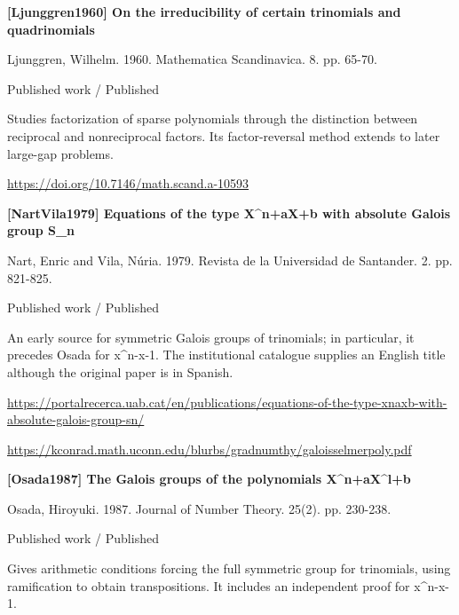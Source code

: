 \documentclass[11pt,a4paper,oneside,openany]{book}
\begin{document}
\hypertarget{ref:Ljunggren1960}{}
{\sffamily\bfseries\color{atlasgreen}[Ljunggren1960] On the irreducibility of certain trinomials and quadrinomials}\par
\color{black} Ljunggren, Wilhelm. 1960. Mathematica Scandinavica. 8. pp. 65-70.\par
{\small\sffamily\color{atlasgold}Published work / Published}\par
\color{black} Studies factorization of sparse polynomials through the distinction between reciprocal and nonreciprocal factors. Its factor-reversal method extends to later large-gap problems.\par
{\footnotesize\url{https://doi.org/10.7146/math.scand.a-10593}}\par
\vspace{9pt}
\hypertarget{ref:NartVila1979}{}
{\sffamily\bfseries\color{atlasgreen}[NartVila1979] Equations of the type X\textasciicircum{}n+aX+b with absolute Galois group S\_\allowbreak{}n}\par
\color{black} Nart, Enric and Vila, Núria. 1979. Revista de la Universidad de Santander. 2. pp. 821-825.\par
{\small\sffamily\color{atlasgold}Published work / Published}\par
\color{black} An early source for symmetric Galois groups of trinomials; in particular, it precedes Osada for x\textasciicircum{}n-x-1. The institutional catalogue supplies an English title although the original paper is in Spanish.\par
{\footnotesize\url{https://portalrecerca.uab.cat/en/publications/equations-of-the-type-xnaxb-with-absolute-galois-group-sn/}}\par
{\footnotesize\url{https://kconrad.math.uconn.edu/blurbs/gradnumthy/galoisselmerpoly.pdf}}\par
\vspace{9pt}
\hypertarget{ref:Osada1987}{}
{\sffamily\bfseries\color{atlasgreen}[Osada1987] The Galois groups of the polynomials X\textasciicircum{}n+aX\textasciicircum{}l+b}\par
\color{black} Osada, Hiroyuki. 1987. Journal of Number Theory. 25(2). pp. 230-238.\par
{\small\sffamily\color{atlasgold}Published work / Published}\par
\color{black} Gives arithmetic conditions forcing the full symmetric group for trinomials, using ramification to obtain transpositions. It includes an independent proof for x\textasciicircum{}n-x-1.\par
\end{document}
